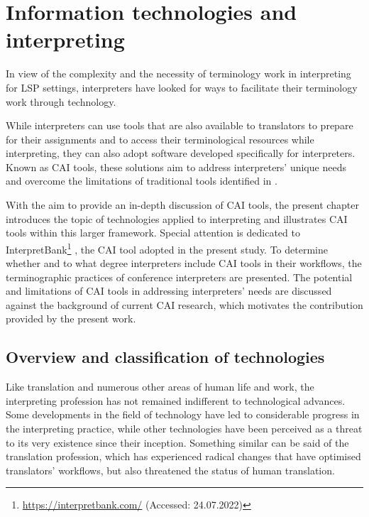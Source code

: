 \chapter{Information technologies and interpreting} \label{chapter2}




In view of the complexity and the necessity of terminology work in interpreting for LSP settings, interpreters have looked for ways to facilitate their terminology work through technology.

While interpreters can use tools that are also available to translators to prepare for their assignments and to access their terminological resources while interpreting, they can also adopt software developed specifically for interpreters. Known as CAI tools, these solutions aim to address interpreters' unique needs and overcome the limitations of traditional tools identified in .

With the aim to provide an in-depth discussion of CAI tools, the present chapter introduces the topic of technologies applied to interpreting and illustrates CAI tools within this larger framework. Special attention is dedicated to InterpretBank\footnote{\url{https://interpretbank.com/} (Accessed: 24.07.2022)} \citep{fantinuoli_interpretbank_2012, fantinuoli_computer-assisted_2017}, the CAI tool adopted in the present study. To determine whether and to what degree interpreters include CAI tools in their workflows, the terminographic practices of conference interpreters are presented. The potential and limitations of CAI tools in addressing interpreters' needs are discussed against the background of current CAI research, which motivates the contribution provided by the present work.

\section{Overview and classification of technologies} \label{tech_overview}
Like translation and numerous other areas of human life and work, the interpreting profession has not remained indifferent to technological advances. Some developments in the field of technology have led to considerable progress in the interpreting practice, while other technologies have been perceived as a threat to its very existence since their inception. Something similar can be said of the translation profession, which has experienced radical changes that have optimised translators' workflows, but also threatened the status of human translation.

